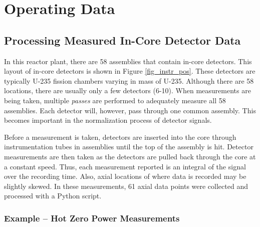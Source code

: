 \section{Operating Data}

\subsection{Processing Measured In-Core Detector Data}
\label{sec:process_measure}
In this reactor plant, there are 58 assemblies that contain in-core detectors.
This layout of in-core detectors is shown in Figure \ref{fig_instr_pos}. These
detectors are typically U-235 fission chambers varying in mass of U-235.
Although there are 58 locations, there are usually only a few detectors (6-10).
When measurements are being taken, multiple \textit{passes} are performed to
adequately measure all 58 assemblies. Each detector will, however, pass through
one common assembly. This becomes important in the normalization process of
detector signals.

Before a measurement is taken, detectors are inserted into the core through 
instrumentation tubes in assemblies until the top of the assembly is hit.
Detector measurements are then taken as the detectors are pulled back through
the core at a constant speed. Thus, each measurement reported is an integral of
the signal over the recording time. Also, axial locations of where data is
recorded may be slightly skewed. In these measurements, 61 axial data points
were collected and processed with a Python script.

\subsubsection{Example -- Hot Zero Power Measurements}

